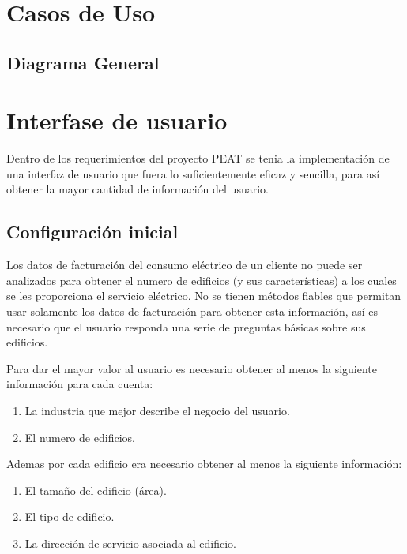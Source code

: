 \section{Casos de Uso}

\subsection{Diagrama General}


\section{Interfase de usuario}
Dentro de los requerimientos del proyecto PEAT se tenia la implementación de una
interfaz de usuario que fuera lo suficientemente eficaz y sencilla, para así obtener
la mayor cantidad de información del usuario.

\subsection{Configuración inicial}

Los datos de facturación del consumo eléctrico de un cliente no puede ser analizados
para obtener el numero de edificios (y sus características) a los cuales se les
proporciona el servicio eléctrico. No se tienen métodos fiables que permitan
usar solamente los datos de facturación para obtener esta información, así es
necesario que el usuario responda una serie de preguntas básicas sobre sus edificios.

Para dar el mayor valor al usuario es necesario obtener al menos la siguiente información
para cada cuenta:

\begin{enumerate}
\item La industria que mejor describe el negocio del usuario.
\item El numero de edificios.
\end{enumerate}

Ademas por cada edificio era necesario obtener al menos la siguiente información:

\begin{enumerate}
\item El tamaño del edificio (área).
\item El tipo de edificio.
\item La dirección de servicio asociada al edificio.
\end{enumerate}

